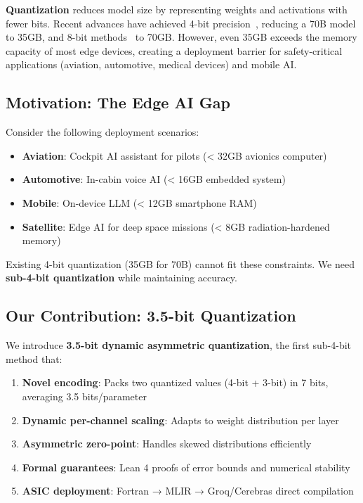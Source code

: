 \documentclass{article}
\begin{document}
\textbf{Quantization} reduces model size by representing weights and activations with fewer bits. Recent advances have achieved 4-bit precision~\cite{frantar2023gptq,lin2023awq,dettmers2023qlora}, reducing a 70B model to 35GB, and 8-bit methods~\cite{dettmers2022llm8bit} to 70GB. However, even 35GB exceeds the memory capacity of most edge devices, creating a deployment barrier for safety-critical applications (aviation, automotive, medical devices) and mobile AI.

\subsection{Motivation: The Edge AI Gap}

Consider the following deployment scenarios:

\begin{itemize}
    \item \textbf{Aviation}: Cockpit AI assistant for pilots (< 32GB avionics computer)
    \item \textbf{Automotive}: In-cabin voice AI (< 16GB embedded system)
    \item \textbf{Mobile}: On-device LLM (< 12GB smartphone RAM)
    \item \textbf{Satellite}: Edge AI for deep space missions (< 8GB radiation-hardened memory)
\end{itemize}

Existing 4-bit quantization (35GB for 70B) cannot fit these constraints. We need \textbf{sub-4-bit quantization} while maintaining accuracy.

\subsection{Our Contribution: 3.5-bit Quantization}

We introduce \textbf{3.5-bit dynamic asymmetric quantization}, the first sub-4-bit method that:

\begin{enumerate}
    \item \textbf{Novel encoding}: Packs two quantized values (4-bit + 3-bit) in 7 bits, averaging 3.5 bits/parameter
    \item \textbf{Dynamic per-channel scaling}: Adapts to weight distribution per layer
    \item \textbf{Asymmetric zero-point}: Handles skewed distributions efficiently
    \item \textbf{Formal guarantees}: Lean 4 proofs of error bounds and numerical stability
    \item \textbf{ASIC deployment}: Fortran → MLIR → Groq/Cerebras direct compilation
\end{enumerate}
\end{document}
